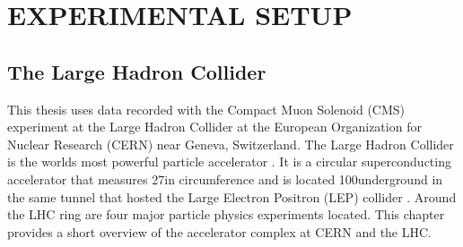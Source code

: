 \part{EXPERIMENTAL SETUP}
\chapter{The Large Hadron Collider}\label{sec:LHC}
\noindent
\justify
This thesis uses data recorded with the Compact Muon Solenoid (CMS) experiment at the Large Hadron Collider at the European Organization for Nuclear Research (CERN) near Geneva, Switzerland. 
The Large Hadron Collider is the worlds most powerful particle accelerator \cite{Brüning:782076}. 
It is a circular superconducting accelerator that measures 27\km in circumference and is located 100\m underground in the same tunnel that hosted the Large Electron Positron (LEP) collider \cite{lep}.
Around the LHC ring are four major particle physics experiments located. 
This chapter provides a short overview of the accelerator complex at CERN and the LHC.
\newpage
